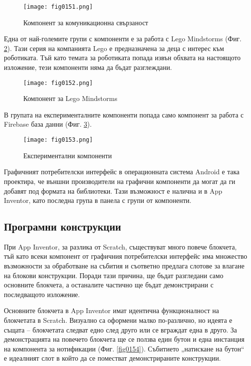 \begin{figure}[H]
  \centering
  \texttt{[image: fig0151.png]}
  \caption{Компонент за комуникационна свързаност}
\label{fig0151}
\end{figure}

Една от най-големите групи с компоненти е за работа с Lego Mindstorms (Фиг. \ref{fig0152}). Тази серия на компанията Lego е предназначена за деца с интерес към роботиката. Тъй като темата за роботиката попада извън обхвата на настоящото изложение, тези компоненти няма да бъдат разглеждани. 

\begin{figure}[H]
  \centering
  \texttt{[image: fig0152.png]}
  \caption{Компонент за Lego Mindstorms}
\label{fig0152}
\end{figure}

В групата на експерименталните компоненти попада само компонент за работа с Firebase база данни (Фиг. \ref{fig0153}).

\begin{figure}[H]
  \centering
  \texttt{[image: fig0153.png]}
  \caption{Експериментални компоненти}
\label{fig0153}
\end{figure}

Графичният потребителски интерфейс в операционната система Android е така проектира, че външни производители на графични компоненти да могат да ги добавят под формата на библиотеки. Тази възможност е налична и в App Inventor, като последна група в панела с групи от компоненти. 

\subsection{Програмни конструкции}

При App Inventor, за разлика от Scratch, съществуват много повече блокчета, тъй като всеки компонент от графичния потребителски интерфейс има множество възможности за обработване на събития и съответно предлага слотове за влагане на блокови конструкции. Поради тази причина, ще бъдат разгледани само основните блокчета, а останалите частично ще бъдат демонстрирани с последващото изложение. 

Основните блокчета в App Inventor имат идентична функционалност на блокчетата в Scratch. Визуално са оформени малко по-различно, но идеята е същата – блокчетата следват едно след друго или се вграждат една в друго. За демонстрацията на повечето блокчета ще се ползва един бутон и една инстанция на компонента за нотификации (Фиг. \ref{fig0154}). Събитието „натискане на бутон“ е идеалният слот в който да се поместват демонстрираните конструкции. 

